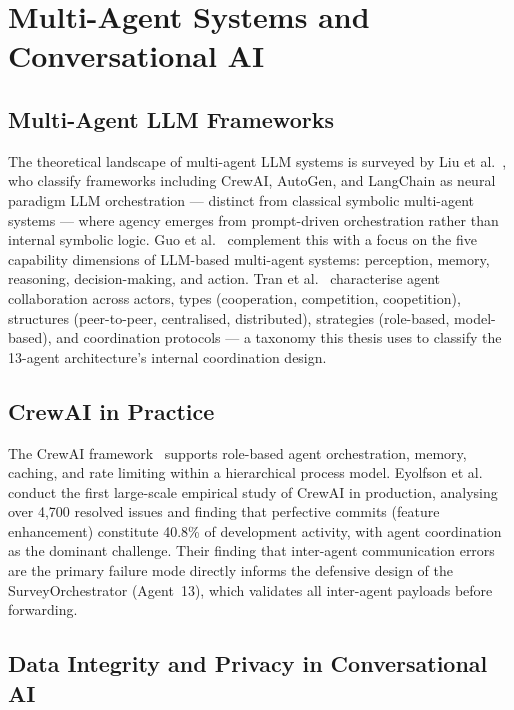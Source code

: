 \section{Multi-Agent Systems and Conversational AI}
\label{sec:rw-multiagent}

\subsection{Multi-Agent LLM Frameworks}

The theoretical landscape of multi-agent LLM systems is surveyed by Liu et
al.~\cite{liu2025agenticai}, who classify frameworks including CrewAI, AutoGen,
and LangChain as neural paradigm LLM orchestration --- distinct from classical
symbolic multi-agent systems --- where agency emerges from prompt-driven
orchestration rather than internal symbolic logic.
Guo et al.~\cite{guo2024multiagent} complement this with a focus on the
five capability dimensions of LLM-based multi-agent systems: perception,
memory, reasoning, decision-making, and action.
Tran et al.~\cite{tran2025multiagent} characterise agent collaboration across
actors, types (cooperation, competition, coopetition), structures (peer-to-peer,
centralised, distributed), strategies (role-based, model-based), and coordination
protocols --- a taxonomy this thesis uses to classify the 13-agent architecture's
internal coordination design.

\subsection{CrewAI in Practice}

The CrewAI framework~\cite{crewai2024} supports role-based agent orchestration,
memory, caching, and rate limiting within a hierarchical process model.
Eyolfson et al.~\cite{eyolfson2026mas} conduct the first large-scale empirical
study of CrewAI in production, analysing over 4,700 resolved issues and finding
that perfective commits (feature enhancement) constitute 40.8\% of development
activity, with agent coordination as the dominant challenge.
Their finding that inter-agent communication errors are the primary failure mode
directly informs the defensive design of the SurveyOrchestrator (Agent~13),
which validates all inter-agent payloads before forwarding.

\subsection{Data Integrity and Privacy in Conversational AI}

